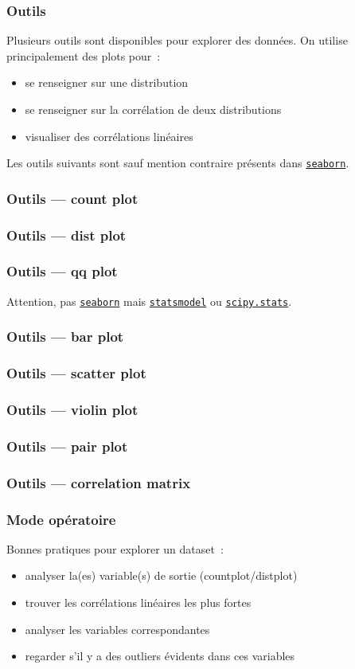 \documentclass{formation}
\begin{document}
\begin{frame}
  \frametitle{Outils}
  Plusieurs outils sont disponibles pour explorer des données. On
  utilise principalement des plots pour :
  \begin{itemize}
  \item se renseigner sur une distribution
  \item se renseigner sur la corrélation de deux distributions
  \item visualiser des corrélations linéaires
  \end{itemize}
  Les outils suivants sont sauf mention contraire présents dans
  \href{https://seaborn.pydata.org/}{\texttt{seaborn}}.
\end{frame}

\begin{frame}
  \frametitle{Outils — count plot}
\end{frame}

\begin{frame}
  \frametitle{Outils — dist plot}
\end{frame}

\begin{frame}
  \frametitle{Outils — qq plot}
  Attention, pas \href{https://seaborn.pydata.org/}{\texttt{seaborn}}
  mais
  \href{http://www.statsmodels.org/stable/index.html}{\texttt{statsmodel}}
  ou
  \href{https://docs.scipy.org/doc/scipy/reference/stats.html}{\texttt{scipy.stats}}.
\end{frame}

\begin{frame}
  \frametitle{Outils — bar plot}
\end{frame}

\begin{frame}
  \frametitle{Outils — scatter plot}
\end{frame}

\begin{frame}
  \frametitle{Outils — violin plot}
\end{frame}

\begin{frame}
  \frametitle{Outils — pair plot}
\end{frame}

\begin{frame}
  \frametitle{Outils — correlation matrix}
\end{frame}

\begin{frame}
  \frametitle{Mode opératoire}
  Bonnes pratiques pour explorer un dataset :
  \begin{itemize}[<+->]
  \item analyser la(es) variable(s) de sortie (countplot/distplot)
  \item trouver les corrélations linéaires les plus fortes
  \item analyser les variables correspondantes
  \item regarder s'il y a des outliers évidents dans ces variables
  \end{itemize}
\end{frame}
\end{document}
